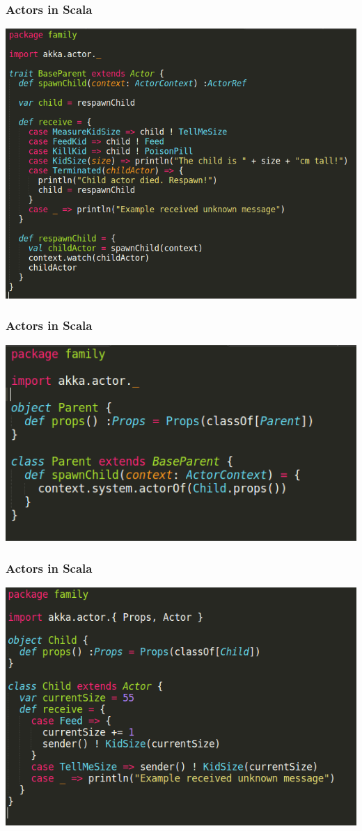 \documentclass{beamer}
\begin{document}

\begin{frame}
\frametitle{Actors in Scala}
\includegraphics[width=0.8\linewidth]{./images/parent_trait.png}
\end{frame}


\begin{frame}
\frametitle{Actors in Scala}
\includegraphics[width=0.8\linewidth]{./images/parent_actor.png}
\end{frame}


\begin{frame}
\frametitle{Actors in Scala}
\includegraphics[width=0.9\linewidth]{./images/parent_child.png}
\end{frame}
\end{document}
